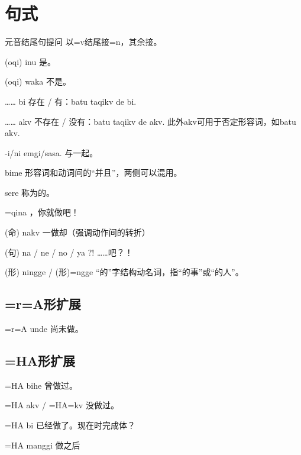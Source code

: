 \pagebreak

\section{句式}

\begin{des}
    \item[元音结尾句提问] 以=v结尾接=n，其余接。
    \item[\A (oqi) \B inu] 是。
    \item[\A (oqi) \B waka] 不是。
    \item[…… bi] 存在 / 有：batu taqikv de bi.
    \item[…… akv] 不存在 / 没有：batu taqikv de akv. 此外akv可用于否定形容词，如batu    akv.
    \item[\A \B -i/ni emgi/sasa.] \A 与\B 一起。
    \item[\lat{adj./v.} bime \lat{adj./v.}]  形容词和动词间的“并且”，两侧可以混用。
    \item[\A sere \B ] 称为\A 的\B 。
    \item[\A \V =qina] \A ，你就做\V 吧！
    \item[\V (命) nakv] 一做\V 却（强调动作间的转折）
    \item[(句) na / ne / no / ya ?!] ……吧？！ 
    \item[\V (形) ningge / \V (形)\!=ngge ] “的”字结构动名词，指“\V 的事”或“\V 的人”。
\end{des}

\subsection{=r=A形扩展}

\begin{des}
    \item[\V =r=A unde] 尚未做。
\end{des}

\subsection{=HA形扩展}

\begin{des}
    \item[\V =HA bihe] 曾做过。
    \item[\V =HA akv / \V =HA=kv] 没做过。
    \item[\V =HA bi] 已经做了\V 。现在时完成体？ 
    \item[\V =HA manggi] 做\V 之后
   
\end{des}

